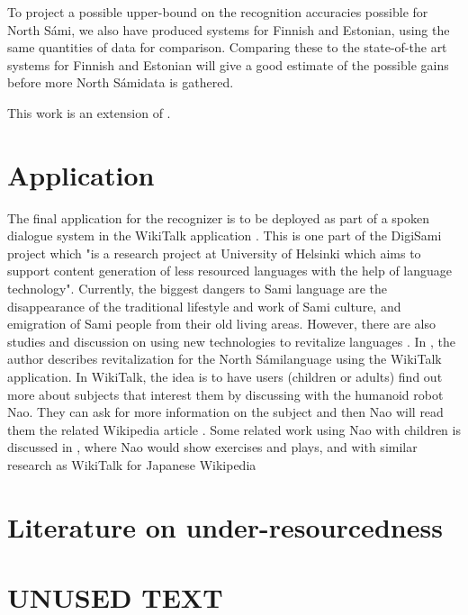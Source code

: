 \documentclass[b5paper]{article}
\newcommand{\ns}{{North Sámi}}
\begin{document}
To project a possible upper-bound on the recognition accuracies possible for \ns, we also have produced systems for Finnish and Estonian, using the same quantities of data for comparison. Comparing these to the state-of-the art systems for Finnish and Estonian will give a good estimate of the possible gains before more \ns data is gathered.

This work is an extension of \cite{leinonen2015}.

\section{Application}
The final application for the recognizer is to be deployed as part of a spoken dialogue system in the WikiTalk application \cite{wilcock2013wikitalk}. This is one part of the DigiSami project which "is a research project at University of Helsinki which aims to support content generation of less resourced languages with the help of language technology". Currently, the biggest dangers to Sami language are the disappearance of the traditional lifestyle and work of Sami culture, and emigration of Sami people from their old living areas. However, there are also studies and discussion on using new technologies to revitalize languages \cite{eisenlohr2004language}. In \cite{jokinen2014open}, the author describes revitalization for the \ns language using the WikiTalk application. In WikiTalk, the idea is to have users (children or adults) find out more about subjects that interest them by discussing with the humanoid robot Nao. They can ask for more information on the subject and then Nao will read them the related Wikipedia article \cite{jokinen2014multimodal}. Some related work using Nao with children is discussed in \cite{kruijff2012spoken}, where Nao would show exercises and plays, and with similar research as WikiTalk for Japanese Wikipedia \cite{kobayashi2011intelligent}




\section{Literature on under-resourcedness}

\section{UNUSED TEXT}
\end{document}
